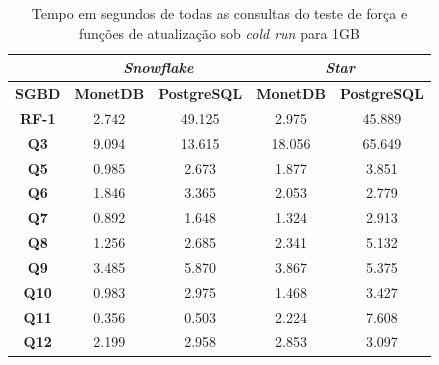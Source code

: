 \begin{table}[htpb]
        \centering
        \caption{Tempo em segundos de todas as consultas do teste de força e funções de atualização sob \textit{cold run} para 1GB}
        \label{tab:queries_cold_1}
        \begin{tabular}{|c|c|c|c|c|} 
        \cline{2-5}
        \multicolumn{1}{c|}{} & \multicolumn{2}{c|}{\textit{\textbf{Snowflake}} } & \multicolumn{2}{c|}{\textit{\textbf{Star}} }  \\ 
        \hline
         \textbf{SGBD}        & \textbf{MonetDB}  & \textbf{PostgreSQL}           & \textbf{MonetDB}  & \textbf{PostgreSQL}       \\ 
        \hline
         \textbf{RF-1}        & 2.742             & 49.125                        & 2.975             & 45.889                    \\ 
        \hline
         \textbf{Q3}          & 9.094             & 13.615                        & 18.056            & 65.649                    \\ 
        \hline
         \textbf{Q5}          & 0.985             & 2.673                         & 1.877             & 3.851                     \\ 
        \hline
         \textbf{Q6}          & 1.846             & 3.365                         & 2.053             & 2.779                     \\ 
        \hline
         \textbf{Q7}          & 0.892             & 1.648                         & 1.324             & 2.913                     \\ 
        \hline
         \textbf{Q8}          & 1.256             & 2.685                         & 2.341             & 5.132                     \\ 
        \hline
         \textbf{Q9}          & 3.485             & 5.870                         & 3.867             & 5.375                     \\ 
        \hline
         \textbf{Q10}         & 0.983             & 2.975                         & 1.468             & 3.427                     \\ 
        \hline
         \textbf{Q11}         & 0.356             & 0.503                         & 2.224             & 7.608                     \\ 
        \hline
         \textbf{Q12}         & 2.199             & 2.958                         & 2.853             & 3.097                     \\ 
        \hline

\end{tabular}
\end{table}
